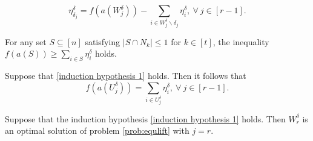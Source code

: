 \documentclass[10pt,a4paper]{amsart}
\newcommand{\D}{\delta}
\begin{document}
\begin{equation}\label{induction hypothesis 1}
	\eta^{\D}_{\D_j}=f(a(W_j^\D))-\sum_{i\in W_j^\D \backslash\D_j}\eta^{\D}_i, ~\forall~ j\in[r-1].
\end{equation}

\begin{Lemma}\label{lem:validity}
	For any set $S \subseteq [n]$ satisfying $|S \cap N_k |\leq 1$ for $k\in[t]$, the inequality $f(a(S))\geq \sum_{i\in S}\eta^\D_i$ holds.
\end{Lemma}

\begin{Lemma}\label{lem:propertyeta}
	Suppose that \eqref{induction hypothesis 1} holds. Then it follows that
	\begin{equation}\label{property:eta}
		f(a(U^\D_j))=\sum_{i\in U^{\D}_j}\eta^{\D}_i, ~\forall~ j\in[r-1].
	\end{equation}
\end{Lemma}

\begin{Lemma}\label{lem:induction}
	Suppose that the induction hypothesis \eqref{induction hypothesis 1} holds. Then $W^{\D}_r$ is an optimal solution of problem \eqref{prob:equlift} with $j=r$.
\end{Lemma}
\end{document}
